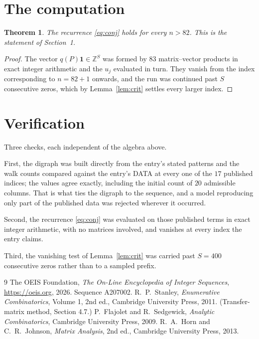\documentclass[11pt,a4paper]{article}
\theoremstyle{plain}
\newtheorem{theorem}{Theorem}
\theoremstyle{definition}
\begin{document}
\section{The computation}

\begin{theorem}
The recurrence \eqref{eq:conj} holds for every $n>82$. This is the statement of
Section~1.
\end{theorem}

\begin{proof}
The vector $q(P)\mathbf{1}\in\mathbb{Z}^{S}$ was formed by $83$ matrix--vector
products in exact integer arithmetic and the $u_j$ evaluated in turn. They vanish from the
index corresponding to $n=82+1$ onwards, and the run was continued past $S$ consecutive
zeros, which by Lemma~\ref{lem:crit} settles every larger index.
\end{proof}

\section{Verification}

Three checks, each independent of the algebra above.

First, the digraph was built directly from the entry's stated patterns and the walk counts
compared against the entry's DATA at every one of the $17$ published indices; the
values agree exactly, including the initial count of $20$ admissible columns. That is
what ties the digraph to the sequence, and a model reproducing only part of the published
data was rejected wherever it occurred.

Second, the recurrence \eqref{eq:conj} was evaluated on those published terms in exact
integer arithmetic, with no matrices involved, and vanishes at every index the entry claims.

Third, the vanishing test of Lemma~\ref{lem:crit} was carried past $S=400$ consecutive
zeros rather than to a sampled prefix.

\begin{thebibliography}{9}
 The OEIS Foundation, \emph{The On-Line Encyclopedia of Integer
Sequences}, \url{https://oeis.org}, 2026. Sequence A207002.
 R.~P.~Stanley, \emph{Enumerative Combinatorics}, Volume 1, 2nd ed.,
Cambridge University Press, 2011. (Transfer-matrix method, Section 4.7.)
 P.~Flajolet and R.~Sedgewick, \emph{Analytic Combinatorics}, Cambridge
University Press, 2009.
 R.~A.~Horn and C.~R.~Johnson, \emph{Matrix Analysis}, 2nd ed., Cambridge
University Press, 2013.
\end{thebibliography}
\end{document}
